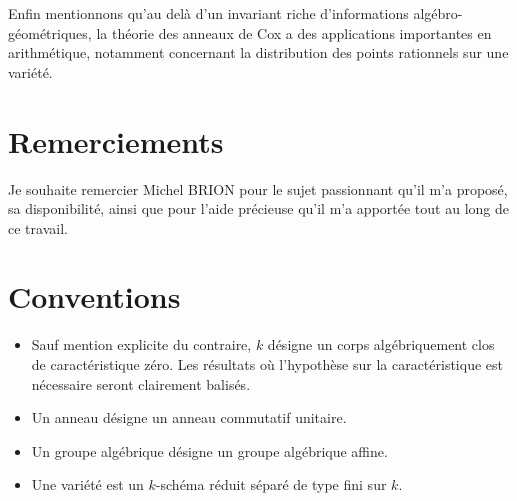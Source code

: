 Enfin mentionnons qu'au delà d'un invariant riche d'informations algébro-géométriques, la théorie des anneaux de Cox a des applications importantes en arithmétique, notamment concernant la distribution des points rationnels sur une variété.



\section*{Remerciements}

Je souhaite remercier Michel BRION pour le sujet passionnant qu'il m'a proposé, sa disponibilité, ainsi que pour l'aide précieuse qu'il m'a apportée tout au long de ce travail.

\section*{Conventions}
\label{conventions}

\begin{itemize}
\item Sauf mention explicite du contraire, $k$ désigne un corps algébriquement clos de caractéristique zéro. Les résultats où l'hypothèse sur la caractéristique est nécessaire seront clairement balisés.
\item Un anneau désigne un anneau commutatif unitaire.
\item Un groupe algébrique désigne un groupe algébrique affine.
\item Une variété est un $k$-schéma réduit séparé de type fini sur $k$.
\end{itemize}


